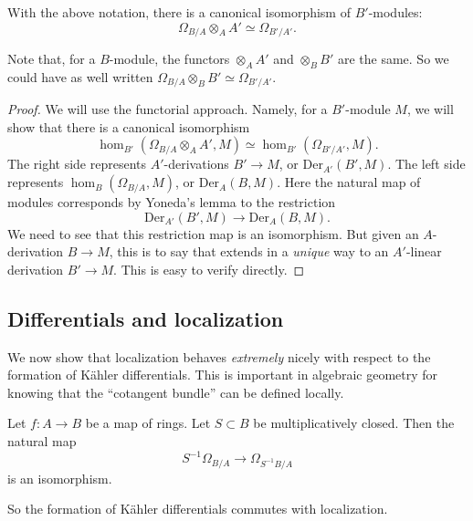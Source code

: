 \begin{proposition} \label{basechangediff} With the above notation, there is a canonical isomorphism
of $B'$-modules:
\[ \Omega_{B/A} \otimes_A A' \simeq \Omega_{B'/A'}.  \]
\end{proposition} 
Note that, for a $B$-module, the functors $\otimes_A A'$ and $\otimes_B B'$ are
the same. So we could have as well written $\Omega_{B/A} \otimes_B B' \simeq
\Omega_{B'/A'}$.
\begin{proof} 
We will use the functorial approach. Namely, for a $B'$-module $M$, we will
show that there is a canonical isomorphism
\[ \hom_{B'}( \Omega_{B/A} \otimes_A A', M) \simeq 
\hom_{B'}( \Omega_{B'/A'}, M) .
\]
The right side represents $A'$-derivations $B' \to M$, or $\mathrm{Der}_{A'}(B', M)$.
The left side represents $\hom_B(\Omega_{B/A}, M)$, or $\mathrm{Der}_A(B, M)$.
Here the natural map of modules corresponds by Yoneda's lemma to the restriction
\[ \mathrm{Der}_{A'}(B', M) \to \mathrm{Der}_A(B, M).  \]
We need to see that this restriction map is an isomorphism. But given an
$A$-derivation $B \to M$, this is to say that extends in a \emph{unique} way to
an $A'$-linear derivation $B' \to M$. This is easy to verify directly.
\end{proof} 


\subsection{Differentials and localization}
We now show that localization behaves \emph{extremely} nicely with respect to
the formation of K\"ahler differentials. This is important in algebraic
geometry for knowing that the ``cotangent bundle'' can be defined locally.

\begin{proposition} \label{localizationdiff}
Let $f: A \to B$ be a map of rings. Let $S \subset  B$ be multiplicatively
closed. Then the natural map
\[ S^{-1}\Omega_{B/A} \to \Omega_{S^{-1}B/A}  \]
is an isomorphism.
\end{proposition} 
So the formation of K\"ahler differentials commutes with localization.

